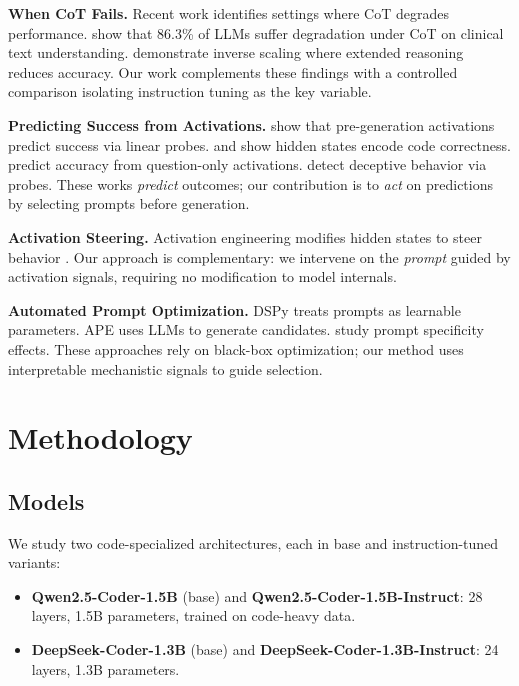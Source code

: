 \documentclass[11pt]{article}
\begin{document}
\textbf{When CoT Fails.} Recent work identifies settings where CoT degrades performance. \citet{wu2025cot_clinical} show that 86.3\% of LLMs suffer degradation under CoT on clinical text understanding. \citet{gema2025inverse_scaling} demonstrate inverse scaling where extended reasoning reduces accuracy. Our work complements these findings with a controlled comparison isolating instruction tuning as the key variable.

\textbf{Predicting Success from Activations.} \citet{encode_failures2025} show that pre-generation activations predict success via linear probes. \citet{code_correctness_repr2025} and \citet{openia2025} show hidden states encode code correctness. \citet{no_answer_needed2025} predict accuracy from question-only activations. \citet{anthropic_probes2024} detect deceptive behavior via probes. These works \emph{predict} outcomes; our contribution is to \emph{act} on predictions by selecting prompts before generation.

\textbf{Activation Steering.} Activation engineering \citep{turner2023activation} modifies hidden states to steer behavior \citep{repeng_survey2025}. Our approach is complementary: we intervene on the \emph{prompt} guided by activation signals, requiring no modification to model internals.

\textbf{Automated Prompt Optimization.} DSPy \citep{khattab2023dspy} treats prompts as learnable parameters. APE \citep{zhou2022large} uses LLMs to generate candidates. \citet{prompt_specificity_code2025} study prompt specificity effects. These approaches rely on black-box optimization; our method uses interpretable mechanistic signals to guide selection.

\section{Methodology}

\subsection{Models}

We study two code-specialized architectures, each in base and instruction-tuned variants:

\begin{itemize}
    \item \textbf{Qwen2.5-Coder-1.5B} \citep{hui2024qwen25coder} (base) and \textbf{Qwen2.5-Coder-1.5B-Instruct}: 28 layers, 1.5B parameters, trained on code-heavy data.
    \item \textbf{DeepSeek-Coder-1.3B} \citep{guo2024deepseek} (base) and \textbf{DeepSeek-Coder-1.3B-Instruct}: 24 layers, 1.3B parameters.
\end{itemize}
\end{document}

